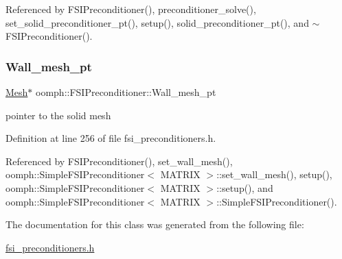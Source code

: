 Referenced by F\+S\+I\+Preconditioner(), preconditioner\+\_\+solve(), set\+\_\+solid\+\_\+preconditioner\+\_\+pt(), setup(), solid\+\_\+preconditioner\+\_\+pt(), and $\sim$\+F\+S\+I\+Preconditioner().

\mbox{\label{classoomph_1_1FSIPreconditioner_ae86cf988796524f905c8d6edc942816a}} 
\subsubsection{\texorpdfstring{Wall\+\_\+mesh\+\_\+pt}{Wall\_mesh\_pt}}
{\footnotesize\ttfamily \hyperlink{classoomph_1_1Mesh}{Mesh}$\ast$ oomph\+::\+F\+S\+I\+Preconditioner\+::\+Wall\+\_\+mesh\+\_\+pt\hspace{0.3cm}{\ttfamily [private]}}



pointer to the solid mesh 



Definition at line 256 of file fsi\+\_\+preconditioners.\+h.



Referenced by F\+S\+I\+Preconditioner(), set\+\_\+wall\+\_\+mesh(), oomph\+::\+Simple\+F\+S\+I\+Preconditioner$<$ M\+A\+T\+R\+I\+X $>$\+::set\+\_\+wall\+\_\+mesh(), setup(), oomph\+::\+Simple\+F\+S\+I\+Preconditioner$<$ M\+A\+T\+R\+I\+X $>$\+::setup(), and oomph\+::\+Simple\+F\+S\+I\+Preconditioner$<$ M\+A\+T\+R\+I\+X $>$\+::\+Simple\+F\+S\+I\+Preconditioner().



The documentation for this class was generated from the following file\+:\begin{DoxyCompactItemize}
\item 
\hyperlink{fsi__preconditioners_8h}{fsi\+\_\+preconditioners.\+h}\end{DoxyCompactItemize}
